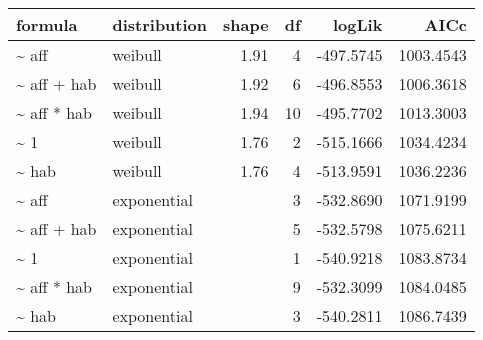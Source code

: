 \begin{table}[ht]
\centering
\begin{tabular}{llrrrr}
 formula & distribution & shape & df & logLik & AICc \\ 
  \hline
\~{} aff & weibull & 1.91 & 4 & -497.5745 & 1003.4543 \\ 
  \~{} aff + hab & weibull & 1.92 & 6 & -496.8553 & 1006.3618 \\ 
  \~{} aff * hab & weibull & 1.94 & 10 & -495.7702 & 1013.3003 \\ 
  \~{} 1 & weibull & 1.76 & 2 & -515.1666 & 1034.4234 \\ 
  \~{} hab & weibull & 1.76 & 4 & -513.9591 & 1036.2236 \\ 
  \~{} aff & exponential &  & 3 & -532.8690 & 1071.9199 \\ 
  \~{} aff + hab & exponential &  & 5 & -532.5798 & 1075.6211 \\ 
  \~{} 1 & exponential &  & 1 & -540.9218 & 1083.8734 \\ 
  \~{} aff * hab & exponential &  & 9 & -532.3099 & 1084.0485 \\ 
  \~{} hab & exponential &  & 3 & -540.2811 & 1086.7439 \\ 
  \end{tabular}
\label{tab:brach}
\end{table}

